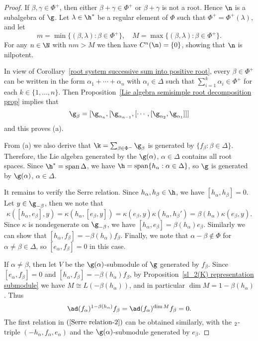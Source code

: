 \begin{proof}
If $\beta,\gamma\in\Phi^+$, then either $\beta+\gamma\in\Phi^+$ or $\beta+\gamma$ is not a root. Hence $\n$ is a subalgebra of $\g$. Let $\lambda\in\h^*$ be a regular element of $\Phi$ such that $\Phi^+=\Phi^+(\lambda)$, and let
\[m=\min\{(\beta,\lambda):\beta\in\Phi^+\},\quad M=\max\{(\beta,\lambda):\beta\in\Phi^+\}.\]
For any $n\in\N$ with $nm>M$ we then have $C^n(\n)=\{0\}$, showing that $\n$ is nilpotent.\par
In view of Corollary~\ref{root system successive sum into positive root}, every $\beta\in\Phi^+$ can be written in the form $\alpha_1+\cdots+\alpha_n$ with $\alpha_i\in\Delta$ such that $\sum_{i=1}^{k}\alpha_i\in\Phi^+$ for each $k\in\{1,\dots,n\}$. Then Proposition~\ref{Lie algebra semisimple root decomposition prop} implies that
\[\g_\beta=[\g_{\alpha_n},[\g_{\alpha_{n-1}},[\cdots,[\g_{\alpha_2},\g_{\alpha_1}]]]\]
and this proves (a).\par
From (a) we also derive that $\k=\sum_{\beta\in\Phi^-}\g_\beta$ is generated by $\{f_\beta:\beta\in\Delta\}$. Therefore, the Lie algebra generated by the $\g(\alpha)$, $\alpha\in\Delta$ contains all root spaces. Since $\h^*=\mathrm{span}\,\Delta$, we have $\h=\mathrm{span}\{h_\alpha:\alpha\in\Delta\}$, so $\g$ is generated by $\g(\alpha)$, $\alpha\in\Delta$.\par
It remains to verify the Serre relation. Since $h_\alpha,h_\beta\in\h$, we have $[h_\alpha,h_\beta]=0$. Let $y\in\g_{-\beta}$, then we note that
\[\kappa([h_\alpha,e_\beta],y)=\kappa(h_\alpha,[e_\beta,y])=\kappa(e_\beta,y)\kappa(h_\alpha,h_\beta')=\beta(h_\alpha)\kappa(e_\beta,y).\]
Since $\kappa$ is nondegenerate on $\g_{-\beta}$, we have $[h_\alpha,e_\beta]=\beta(h_\alpha)e_\beta$. Similarly we can show that $[h_\alpha,f_\beta]=-\beta(h_\alpha)f_\beta$. Finally, we note that $\alpha-\beta\notin\Phi$ for $\alpha\neq\beta\in\Delta$, so $[e_\alpha,f_\beta]=0$ in this case.\par
If $\alpha\neq\beta$, then let $V$ be the $\g(\alpha)$-submodule of $\g$ generated by $f_\beta$. Since $[e_\alpha,f_\beta]=0$ and $[h_\alpha,f_\beta]=-\beta(h_\alpha)f_\beta$, by Proposition~\ref{sl_2(K) representation submodule} we have $M\cong L(-\beta(h_\alpha))$, and in particular $\dim M=1-\beta(h_\alpha)$. Thus
\[\ad(f_\alpha)^{1-\beta(h_\alpha)}f_\beta=\ad(f_\alpha)^{\dim M}f_\beta=0.\]
The first relation in $(\ref{Serre relation-2})$ can be obtained similarly, with the $\sl_2$-triple $(-h_\alpha,f_\alpha,e_\alpha)$ and the $\g(\alpha)$-submodule generated by $e_\beta$.
\end{proof}
